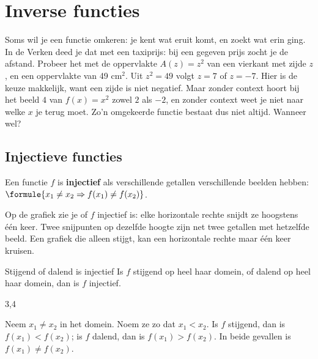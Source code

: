 \section{Inverse functies}

Soms wil je een functie omkeren: je kent wat eruit komt, en zoekt wat erin ging. In de Verken deed je dat met een taxiprijs: bij een gegeven prijs zocht je de afstand. Probeer het met de oppervlakte $A(z) = z^2$ van een vierkant met zijde $z$, en een oppervlakte van 49 cm$^2$. Uit $z^2 = 49$ volgt $z = 7$ of $z = -7$. Hier is de keuze makkelijk, want een zijde is niet negatief. Maar zonder context hoort bij het beeld $4$ van $f(x) = x^2$ zowel $2$ als $-2$, en zonder context weet je niet naar welke $x$ je terug moet. Zo'n omgekeerde functie bestaat dus niet altijd. Wanneer wel?

\subsection{Injectieve functies}

\begin{theorie}
Een functie $f$ is \textbf{\textcolor{accent}{injectief}} als verschillende getallen verschillende beelden hebben: $\formule{x_1 \neq x_2 \Rightarrow f(x_1) \neq f(x_2)}$.
\end{theorie}

Op de grafiek zie je of $f$ injectief is: elke horizontale rechte snijdt ze hoogstens één keer. Twee snijpunten op dezelfde hoogte zijn net twee getallen met hetzelfde beeld. Een grafiek die alleen stijgt, kan een horizontale rechte maar één keer kruisen.

\begin{theorie}
\begin{stelling}{Stijgend of dalend is injectief}
Is $f$ stijgend op heel haar domein, of dalend op heel haar domein, dan is $f$ injectief.
\end{stelling}

\begin{alleenvoor}{3,4}
\begin{bewijs}
Neem $x_1 \neq x_2$ in het domein. Noem ze zo dat $x_1 < x_2$. Is $f$ stijgend, dan is $f(x_1) < f(x_2)$; is $f$ dalend, dan is $f(x_1) > f(x_2)$. In beide gevallen is $f(x_1) \neq f(x_2)$.
\end{bewijs}
\end{alleenvoor}
\end{theorie}

